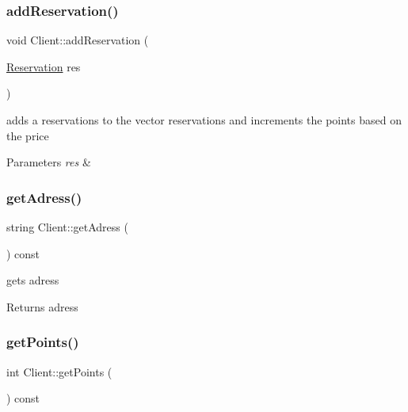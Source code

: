 \subsubsection{\texorpdfstring{add\+Reservation()}{addReservation()}}
{\footnotesize\ttfamily void Client\+::add\+Reservation (\begin{DoxyParamCaption}\item[{\hyperlink{class_reservation}{Reservation}}]{res }\end{DoxyParamCaption})}



adds a reservations to the vector reservations and increments the points based on the price 


\begin{DoxyParams}{Parameters}
{\em res} & \\
\hline
\end{DoxyParams}
\hypertarget{class_client_aa862036fb46de26f7e4e6991adb9b2dc}{}\label{class_client_aa862036fb46de26f7e4e6991adb9b2dc} 
\subsubsection{\texorpdfstring{get\+Adress()}{getAdress()}}
{\footnotesize\ttfamily string Client\+::get\+Adress (\begin{DoxyParamCaption}{ }\end{DoxyParamCaption}) const\hspace{0.3cm}{\ttfamily [inline]}}



gets adress 

\begin{DoxyReturn}{Returns}
adress 
\end{DoxyReturn}
\hypertarget{class_client_aa3824f589da51dc537ccab1bcfcc8e85}{}\label{class_client_aa3824f589da51dc537ccab1bcfcc8e85} 
\subsubsection{\texorpdfstring{get\+Points()}{getPoints()}}
{\footnotesize\ttfamily int Client\+::get\+Points (\begin{DoxyParamCaption}{ }\end{DoxyParamCaption}) const\hspace{0.3cm}{\ttfamily [inline]}}



